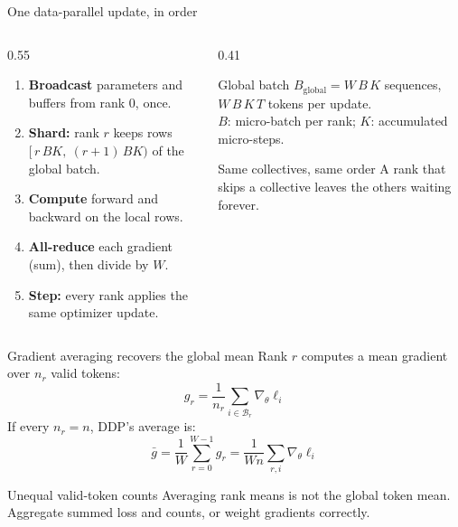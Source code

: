 \documentclass[handout]{beamer}
\begin{document}
\begin{frame}{One data-parallel update, in order}
  \begin{columns}[c]
    \begin{column}{0.55\linewidth}
      \small
      \begin{enumerate}
          \setlength{\itemsep}{6pt}
        \item \textbf{Broadcast} parameters and buffers from rank 0, once.
        \item \textbf{Shard:} rank $r$ keeps rows $[\,r\,BK,\ (r+1)\,BK)$ of the global batch.
        \item \textbf{Compute} forward and backward on the local rows.
        \item \textbf{All-reduce} each gradient (sum), then divide by $W$.
        \item \textbf{Step:} every rank applies the same optimizer update.
      \end{enumerate}
    \end{column}
    \begin{column}{0.41\linewidth}
      \begin{block}{Global batch}
        $B_{\text{global}}=W\,B\,K$ sequences, $W\,B\,K\,T$ tokens per update.\\[2pt]
        {\footnotesize $B$: micro-batch per rank; $K$: accumulated micro-steps.}
      \end{block}
      \begin{alertblock}{Same collectives, same order}
        A rank that skips a collective leaves the others waiting forever.
      \end{alertblock}
    \end{column}
  \end{columns}
\end{frame}

\begin{frame}{Gradient averaging recovers the global mean}
  Rank $r$ computes a mean gradient over $n_r$ valid tokens:
  \[
    g_r=\frac{1}{n_r}\sum_{i\in\mathcal{B}_r}\nabla_\theta \ell_i
  \]
  If every $n_r=n$, DDP's average is:
  \[
    \bar g=\frac{1}{W}\sum_{r=0}^{W-1}g_r
    =\frac{1}{Wn}\sum_{r,i}\nabla_\theta\ell_i
  \]
  \begin{alertblock}{Unequal valid-token counts}
    Averaging rank means is not the global token mean. Aggregate summed loss and counts, or weight gradients correctly.
  \end{alertblock}
\end{frame}
\end{document}

